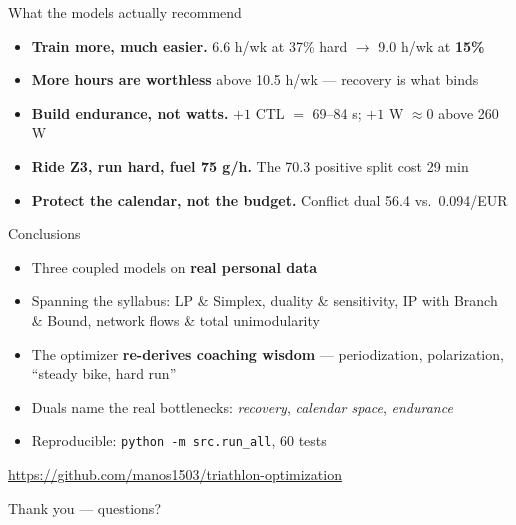 \documentclass[10pt,aspectratio=169]{beamer}
\newcommand{\speakernote}[1]{}
\begin{document}
\speakernote{coherence}

\begin{frame}{What the models actually recommend}
\begin{itemize}\itemsep9pt
  \item \textbf{Train more, much easier.} 6.6 h/wk at 37\% hard
        $\rightarrow$ 9.0 h/wk at \textbf{15\%}
  \item \textbf{More hours are worthless} above 10.5 h/wk --- recovery is what binds
  \item \textbf{Build endurance, not watts.} $+1$ CTL $=$ 69--84 s; $+1$ W $\approx 0$ above 260 W
  \item \textbf{Ride Z3, run hard, fuel 75 g/h.} The 70.3 positive split cost 29 min
  \item \textbf{Protect the calendar, not the budget.} Conflict dual 56.4 vs.\ 0.094/EUR
\end{itemize}
\end{frame}

\speakernote{recommendations}

\begin{frame}{Conclusions}
\begin{itemize}\itemsep10pt
  \item Three coupled models on \textbf{real personal data}
  \item Spanning the syllabus: LP \& Simplex, duality \& sensitivity,
        IP with Branch \& Bound, network flows \& total unimodularity
  \item The optimizer \textbf{re-derives coaching wisdom} --- periodization,
        polarization, ``steady bike, hard run''
  \item Duals name the real bottlenecks: \emph{recovery}, \emph{calendar space},
        \emph{endurance}
  \item Reproducible: \texttt{python -m src.run\_all}, 60 tests
\end{itemize}
\vspace{6pt}
\begin{center}
{\footnotesize\url{https://github.com/manos1503/triathlon-optimization}}

\vspace{6pt}
\Large Thank you --- questions?
\end{center}
\end{frame}

\speakernote{conclusions}
\end{document}
